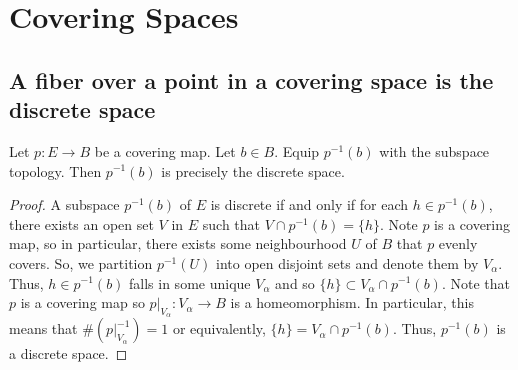 \documentclass{article}
\begin{document}
\section{Covering Spaces}

\subsection*{A fiber over a point in a covering space is the discrete space}

Let $p: E\to B$ be a covering map. Let $b\in B$. Equip $p^{-1}(b)$ with the subspace topology. Then $p^{-1}(b)$ is precisely the discrete space.
\begin{proof}
	A subspace $p^{-1}(b)$ of $E$ is discrete if and only if for each $h\in p^{-1}(b)$, there exists an open set $V$ in $E$ such that $V\cap p^{-1}(b) = \{h\}$. Note $p$ is a covering
	map, so in particular, there exists some neighbourhood $U$ of $B$ that $p$ evenly covers. So, we partition $p^{-1}(U)$ into open disjoint sets and denote them by $V_{\alpha}$.
	Thus, $h\in p^{-1}(b)$ falls in some unique $V_{\alpha}$ and so $\{h\} \subset V_{\alpha} \cap p^{-1}(b)$. Note that $p$ is a covering map so $p|_{V_{\alpha}}: V_{\alpha} \to B$ 
	is a homeomorphism. In particular, this means that $\# (p|_{V_{\alpha}}^{-1})=1$ or equivalently, $\{h\} = V_{\alpha} \cap p^{-1}(b)$. Thus, $p^{-1}(b)$ is a discrete space.
\end{proof}
\end{document}
